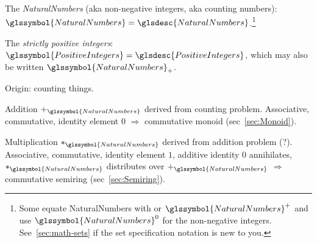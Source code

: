 \setcounter{currentlevel}{\value{baseSectionLevel}}
\label{sec:Numbers}

% 


\lstset{language=Clojure}

\label{sec:Natural-numbers}

The \textit{\gls{NaturalNumbers}} 
(aka non-negative integers, aka counting
numbers):\label{NaturalNumbers}
$\glssymbol{NaturalNumbers} = 
\glsdesc{NaturalNumbers}$.\footnote{ 
Some
equate \gls{NaturalNumbers} with  
or $\glssymbol{NaturalNumbers}^{+}$ and use
$\glssymbol{NaturalNumbers}^{0}$ for the non-negative integers. 
See~\autoref{sec:math-sets} if the set specification
notation is new to you.}

The \textit{strictly positive integers}: 
$\glssymbol{PositiveIntegers} = \glsdesc{PositiveIntegers}$, which 
may also be written $\glssymbol{NaturalNumbers}_{+}$.

Origin: counting things.

Addition $+_{\glssymbol{NaturalNumbers}}$ 
derived from counting problem.
Associative, commutative, identity element $0$ $\Rightarrow$ 
commutative monoid (sec~\ref{sec:Monoid}).

Multiplication $*_{\glssymbol{NaturalNumbers}}$
derived from addition problem (?).
Associative, commutative, identity element $1$,
additive identity $0$ annihilates,
$*_{\glssymbol{NaturalNumbers}}$ distributes over 
$+_{\glssymbol{NaturalNumbers}}$ 
 $\Rightarrow$
commutative semiring 
(sec~\ref{sec:Semiring}).



